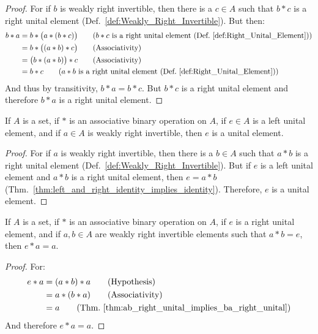     \begin{proof}
        For if $b$ is weakly right invertible, then there is a $c\in{A}$ such
        that $b*c$ is a right unital element
        (Def.~\ref{def:Weakly_Right_Invertible}). But then:
        \begin{align}
            b*a&=b*\big(a*(b*c)\big)
            \tag{$b*c$ is a right unital element %
                 (Def.~\ref{def:Right_Unital_Element})}\\
            &=b*\big((a*b)*c\big)
            \tag{Associativity}\\
            &=\big(b*(a*b)\big)*c
            \tag{Associativity}\\
            &=b*c
            \tag{$a*b$ is a right unital element %
                 (Def.~\ref{def:Right_Unital_Element})}
        \end{align}
        And thus by transitivity, $b*a=b*c$. But $b*c$ is a right unital element
        and therefore $b*a$ is a right unital element.
    \end{proof}
    \begin{theorem}
        If $A$ is a set, if $*$ is an associative binary operation on $A$, if
        $e\in{A}$ is a left unital element, and if $a\in{A}$ is weakly right
        invertible, then $e$ is a unital element.
    \end{theorem}
    \begin{proof}
        For if $a$ is weakly right invertible, then there is a $b\in{A}$ such
        that $a*b$ is a right unital element
        (Def.~\ref{def:Weakly_Right_Invertible}). But if $e$ is a left unital
        element and $a*b$ is a right unital element, then $e=a*b$
        (Thm.~\ref{thm:left_and_right_identity_implies_identity}). Therefore,
        $e$ is a unital element.
    \end{proof}
    \begin{theorem}
        \label{thm:right_unit_with_right_inv_almost_implies_unit}%
        If $A$ is a set, if $*$ is an associative binary operation on $A$, if
        $e$ is a right unital element, and if $a,b\in{A}$ are weakly right
        invertible elements such that $a*b=e$, then $e*a=a$.
    \end{theorem}
    \begin{proof}
        For:
        \begin{align}
            e*a&=(a*b)*a
            \tag{Hypothesis}\\
            &=a*(b*a)
            \tag{Associativity}\\
            &=a
            \tag{Thm.~\ref{thm:ab_right_unital_implies_ba_right_unital}}
        \end{align}
        And therefore $e*a=a$.
    \end{proof}
